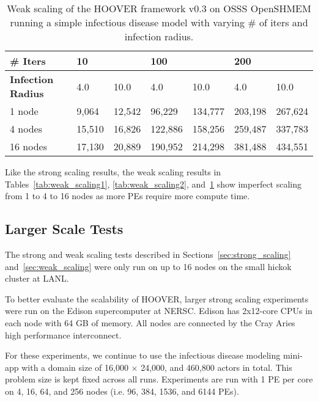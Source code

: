 \begin{table}
\centering
\begin{tabularx}{\textwidth}{ | l || X | X | X | X | X | X | }
\hline
\textbf{\# Iters}           & \multicolumn{2}{|X|}{\textbf{10}} & \multicolumn{2}{|X|}{\textbf{100}} & \multicolumn{2}{|X|}{\textbf{200}} \\\hline
\textbf{Infection Radius}   & 4.0          & 10.0         & 4.0           & 10.0          & 4.0           & 10.0 \\\hline
1 node                      &  9,064 & 12,542 &  96,229 & 134,777 & 203,198 & 267,624 \\\hline
4 nodes                     & 15,510 & 16,826 & 122,886 & 158,256 & 259,487 & 337,783 \\\hline
16 nodes                    & 17,130 & 20,889 & 190,952 & 214,298 & 381,488 & 434,551 \\\hline
\end{tabularx}
\caption{Weak scaling of the HOOVER framework v0.3 on OSSS OpenSHMEM running a
    simple infectious disease model with varying \# of iters and infection
    radius.}
\label{tab:weak_scaling3}
\end{table}

Like the strong scaling results, the weak scaling results in
Tables~\ref{tab:weak_scaling1}, \ref{tab:weak_scaling2},
and~\ref{tab:weak_scaling3} show imperfect scaling from 1 to 4 to 16 nodes as
more PEs require more compute time.

\subsection{Larger Scale Tests}

The strong and weak scaling tests described in Sections~\ref{sec:strong_scaling}
and~\ref{sec:weak_scaling} were only run on up to 16 nodes on the small hickok
cluster at LANL.

To better evaluate the scalability of HOOVER, larger strong scaling experiments
were run on the Edison supercomputer at NERSC. Edison has 2x12-core CPUs in each
node with 64 GB of memory. All nodes are connected by the Cray Aries
high performance interconnect.

For these experiments, we continue to use the infectious disease modeling
mini-app with a domain size of 16,000 $\times$ 24,000, and 460,800 actors in
total. This problem size is kept fixed across all runs. Experiments are run with
1 PE per core on 4, 16, 64, and 256 nodes (i.e. 96, 384, 1536, and 6144 PEs).

